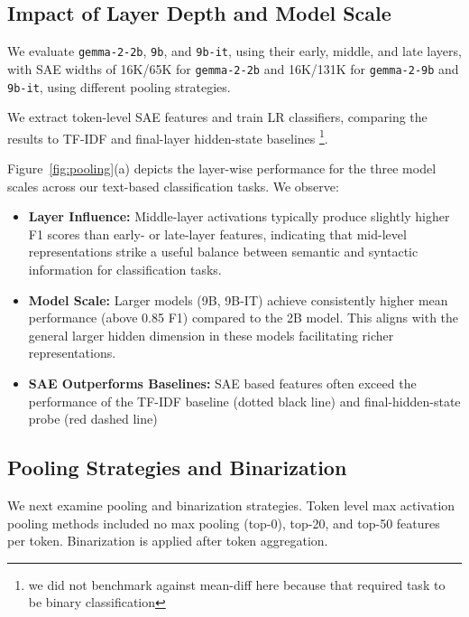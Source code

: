 \subsection{Impact of Layer Depth and Model Scale}

We evaluate \texttt{gemma-2-2b}, \texttt{9b}, and \texttt{9b-it}, using their early, middle, and late layers, with SAE widths of 16K/65K for \texttt{gemma-2-2b} and 16K/131K for \texttt{gemma-2-9b} and \texttt{9b-it}, using different pooling strategies.


We extract token-level SAE features and train LR classifiers, comparing the results to TF-IDF and final-layer hidden-state baselines \footnote{we did not benchmark against mean-diff here because that required task to be binary classification}.

Figure~\ref{fig:pooling}(a) depicts the layer-wise performance for the three model scales across our text-based classification tasks. We observe:

\begin{itemize}[itemsep=-2pt,topsep=1.5pt]
    \item \textbf{Layer Influence:} Middle-layer activations typically produce slightly higher F1 scores than early- or late-layer features, indicating that mid-level representations strike a useful balance between semantic and syntactic information for classification tasks.
    \item \textbf{Model Scale:} Larger models (9B, 9B-IT) achieve consistently higher mean performance (above 0.85 F1) compared to the 2B model. This aligns with the general larger hidden dimension in these models facilitating richer representations.
    \item \textbf{SAE Outperforms Baselines:} SAE based features often exceed the performance of the TF-IDF baseline (dotted black line) and final-hidden-state probe (red dashed line)
\end{itemize}


\subsection{Pooling Strategies and Binarization}

We next examine pooling and binarization strategies. Token level max activation pooling methods included no max pooling (top-0), top-20, and top-50 features per token. Binarization is applied after token aggregation. 

